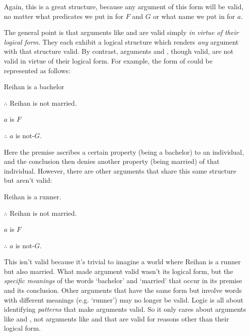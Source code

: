 \noindent Again, this is a great structure, because any argument of this form will be valid, no matter what predicates we put in for $F$ and $G$ or what name we put in for $a$.


The general point is that arguments like  and   are valid simply \emph{in virtue of their logical form}.  They each exhibit a logical structure which renders \emph{any} argument with that structure valid.  By contrast, arguments   and , though valid, are not valid in virtue of their logical form.  For example, the form of  could be represented as follows:

\begin{multicols}{2}

\begin{earg}
\item[\eref{exarg6}] Reihan is a bachelor
\item[] $\therefore$ Reihan is not married.
\end{earg}

\columnbreak

\begin{earg}
\item[] $a$ is $F$
\item[] $\therefore$ $a$ is not-$G$.
\end{earg}
\end{multicols}
\noindent Here the premise ascribes a certain property (being a bachelor) to an individual, and the conclusion then denies another property (being married) of that individual. However, there are other arguments that share this same structure but aren't valid:
\begin{multicols}{2}
\begin{earg}
\item[] Reihan is a runner.
\item[] $\therefore$ Reihan is not married.
\end{earg}

\columnbreak

\begin{earg}
\item[] $a$ is $F$
\item[] $\therefore$ $a$ is not-$G$.
\end{earg}
\end{multicols}
This isn't valid because it's trivial to imagine a world where Reihan is a runner but also married.  What made argument  valid wasn't its logical form, but the \emph{specific meanings} of the words `bachelor' and `married' that occur in its premise and its conclusion. Other arguments that have the same form but involve words with different meanings (e.g. `runner') may no longer be valid. Logic is all about identifying \emph{patterns} that make arguments valid.  So it only cares about  arguments like  and , not arguments like  and  that are valid for reasons other than their logical form. 




